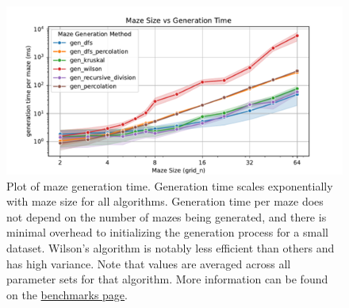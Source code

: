 \begin{figure}
	\hypertarget{fig:benchmarks}{%
		\centering
		\includegraphics[width=\textwidth]{figures/benchmarks/gridsize-vs-gentime.pdf}
		\caption{
			Plot of maze generation time. Generation time scales
			exponentially with maze size for all algorithms. Generation time per
			maze does not depend on the number of mazes being generated, and there
			is minimal overhead to initializing the generation process for a small
			dataset. Wilson's algorithm is notably less efficient than others and
			has high variance. Note that values are averaged across all parameter
			sets for that algorithm. More information can be found on the
			\href{https://understanding-search.github.io/maze-dataset/benchmarks/}{benchmarks page}.
		}
		\label{fig:benchmarks}
	}
\end{figure}